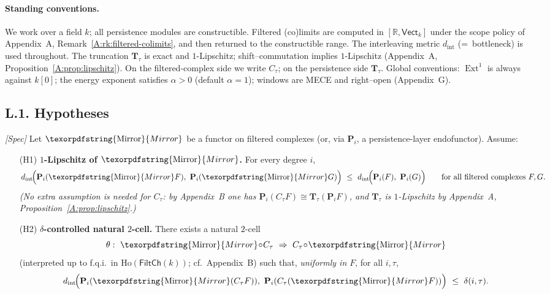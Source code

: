 \documentclass[11pt]{article}
\DeclareMathOperator{\Ext}{Ext}
\newcommand{\Ho}{\mathrm{Ho}}
\numberwithin{equation}{section}
\theoremstyle{definition}
\DeclareRobustCommand{\Mirror}{\texorpdfstring{\ensuremath{\operatorname{Mirror}}}{Mirror}}
\begin{document}
\paragraph{Standing conventions.}
We work over a field \(k\); all persistence modules are constructible.
Filtered (co)limits are computed in \([\mathbb{R},\mathsf{Vect}_k]\) under the scope policy of Appendix~A, Remark~\ref{A:rk:filtered-colimits}, and then returned to the constructible range.
The interleaving metric \(d_{\mathrm{int}}\) (=\ bottleneck) is used throughout.
The truncation \(\mathbf{T}_\tau\) is exact and \(1\)-Lipschitz; shift–commutation implies \(1\)-Lipschitz (Appendix~A, Proposition~\ref{A:prop:lipschitz}).
On the filtered-complex side we write \(C_\tau\); on the persistence side \(\mathbf{T}_\tau\).
Global conventions: \(\Ext^1\) is always against \(k[0]\); the energy exponent satisfies \(\alpha>0\) (default \(\alpha=1\)); windows are MECE and right–open (Appendix~G).

\subsection*{L.1. Hypotheses}
\emph{[Spec]} Let \(\Mirror\) be a functor on filtered complexes (or, via \(\mathbf{P}_i\), a persistence-layer endofunctor). Assume:

\begin{itemize}\itemsep0.35em
  \item[(H1)] \textbf{\(1\)-Lipschitz of \(\Mirror\).} For every degree \(i\),
  \[
    d_{\mathrm{int}}\!\Big(\mathbf{P}_i(\Mirror F),\ \mathbf{P}_i(\Mirror G)\Big)
      \ \le\ d_{\mathrm{int}}\!\Big(\mathbf{P}_i(F),\ \mathbf{P}_i(G)\Big)
      \qquad\text{for all filtered complexes }F,G.
  \]
  \emph{(No extra assumption is needed for \(C_\tau\): by Appendix~B one has
  \(\mathbf{P}_i(C_\tau F)\cong \mathbf{T}_\tau(\mathbf{P}_iF)\), and \(\mathbf{T}_\tau\) is \(1\)-Lipschitz by Appendix~A, Proposition~\ref{A:prop:lipschitz}.)}
  \item[(H2)] \textbf{\(\delta\)-controlled natural \(2\)-cell.} There exists a natural \(2\)-cell
  \[
    \theta:\ \Mirror\!\circ\! C_\tau\ \Rightarrow\ C_\tau\!\circ\!\Mirror
  \]
  (interpreted up to f.q.i.\ in \(\Ho(\mathsf{FiltCh}(k))\); cf.\ Appendix~B) such that, \emph{uniformly in \(F\)}, for all \(i,\tau\),
  \[
    d_{\mathrm{int}}\!\Big(\mathbf{P}_i(\Mirror(C_\tau F)),\ \mathbf{P}_i(C_\tau(\Mirror F))\Big)\ \le\ \delta(i,\tau).
  \]
\end{itemize}
\end{document}
